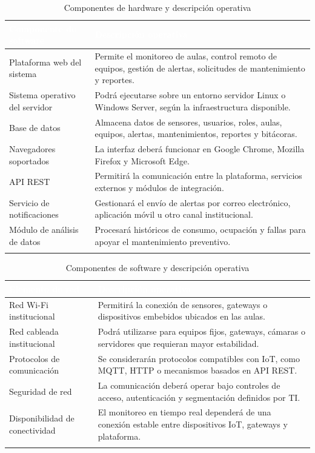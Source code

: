 \begingroup
\small
\begin{longtable}{|p{7.8cm}|p{7.8cm}|}
\hline
\cellcolor{sigagreen}\textcolor{white}{\textbf{Componente de software}} & \cellcolor{sigagreen}\textcolor{white}{\textbf{Descripción operativa}} \\ \hline
Plataforma web del sistema & Permite el monitoreo de aulas, control remoto de equipos, gestión de alertas, solicitudes de mantenimiento y reportes. \\ \hline
Sistema operativo del servidor & Podrá ejecutarse sobre un entorno servidor Linux o Windows Server, según la infraestructura disponible. \\ \hline
Base de datos & Almacena datos de sensores, usuarios, roles, aulas, equipos, alertas, mantenimientos, reportes y bitácoras. \\ \hline
Navegadores soportados & La interfaz deberá funcionar en Google Chrome, Mozilla Firefox y Microsoft Edge. \\ \hline
API REST & Permitirá la comunicación entre la plataforma, servicios externos y módulos de integración. \\ \hline
Servicio de notificaciones & Gestionará el envío de alertas por correo electrónico, aplicación móvil u otro canal institucional. \\ \hline
Módulo de análisis de datos & Procesará históricos de consumo, ocupación y fallas para apoyar el mantenimiento preventivo. \\ \hline
\caption{Componentes de hardware y descripción operativa}
\end{longtable}
\endgroup

\begingroup
\small
\begin{longtable}{|p{7.8cm}|p{7.8cm}|}
\hline
\cellcolor{sigagreen}\textcolor{white}{\textbf{Elemento de red}} & \cellcolor{sigagreen}\textcolor{white}{\textbf{Descripción operativa}} \\ \hline
Red Wi-Fi institucional & Permitirá la conexión de sensores, gateways o dispositivos embebidos ubicados en las aulas. \\ \hline
Red cableada institucional & Podrá utilizarse para equipos fijos, gateways, cámaras o servidores que requieran mayor estabilidad. \\ \hline
Protocolos de comunicación & Se considerarán protocolos compatibles con IoT, como MQTT, HTTP o mecanismos basados en API REST. \\ \hline
Seguridad de red & La comunicación deberá operar bajo controles de acceso, autenticación y segmentación definidos por TI. \\ \hline
Disponibilidad de conectividad & El monitoreo en tiempo real dependerá de una conexión estable entre dispositivos IoT, gateways y plataforma. \\ \hline
\caption{Componentes de software y descripción operativa}
\end{longtable}
\endgroup

